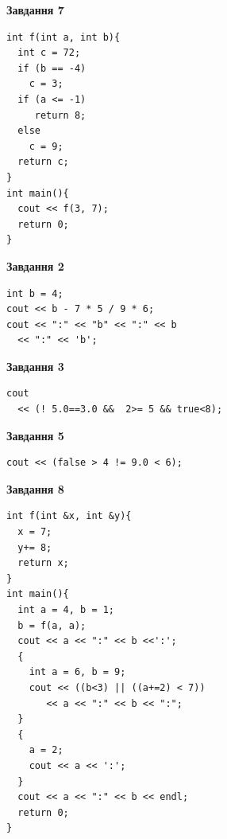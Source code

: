 \documentclass[12pt, ukrainian]{article}
\begin{document}
{\begin {large}
\begin{minipage}[t]{7.0cm}
\begin{center}
\textbf{Завдання 7}
\end{center}
\vspace{-8mm}

\begin{verbatim}
int f(int a, int b){
  int c = 72;
  if (b == -4)
    c = 3;
  if (a <= -1)
     return 8;
  else
    c = 9;
  return c;
}
int main(){
  cout << f(3, 7);
  return 0;
}
\end{verbatim}

\end{minipage}
\vline \hspace{1mm}
\begin{minipage}[t]{11.0cm}

\begin{center}
\textbf{Завдання 2}
\end{center}
\vspace{-8mm}

\begin{verbatim}
int b = 4;
cout << b - 7 * 5 / 9 * 6;
cout << ":" << "b" << ":" << b 
  << ":" << 'b';
\end{verbatim}



\begin{center}
\textbf{Завдання 3}
\end{center}
\vspace{-8mm}

\begin{verbatim}
cout 
  << (! 5.0==3.0 &&  2>= 5 && true<8);
\end{verbatim}



\begin{center}
\textbf{Завдання 5}
\end{center}
\vspace{-8mm}

\begin{verbatim}
cout << (false > 4 != 9.0 < 6);
\end{verbatim}



\begin{center}
\textbf{Завдання 8}
\end{center}
\vspace{-8mm}

\begin{verbatim}
int f(int &x, int &y){
  x = 7;
  y+= 8;
  return x;
}
int main(){
  int a = 4, b = 1;
  b = f(a, a);
  cout << a << ":" << b <<':';
  {
    int a = 6, b = 9;
    cout << ((b<3) || ((a+=2) < 7))
       << a << ":" << b << ":";
  }
  {
    a = 2;
    cout << a << ':';
  }
  cout << a << ":" << b << endl;
  return 0;
}
\end{verbatim}


\end{minipage}
\end{large}}
\end{document}
